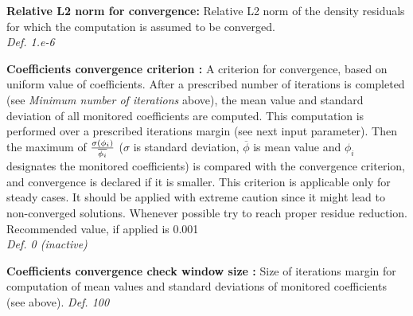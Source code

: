 \documentclass[12pt,epsf,colordvi]{article}
\begin{document}
\begin{description}
%
    \item{\bf Relative L2 norm for convergence:} Relative L2 norm of the density residuals for which the computation is assumed to be converged. \\
{\it Def. 1.e-6}
%
   \item{\bf Coefficients convergence criterion : } A criterion for convergence, based on uniform value of coefficients. After a prescribed number of iterations is completed (see {\it Minimum number of iterations } above), the mean value and standard deviation of all monitored coefficients are computed. This computation is performed over a prescribed iterations margin (see next input parameter). Then the maximum of \({{\sigma (\phi_i) } \over \overline{ \phi_i}} \)  (\(\sigma\) is standard deviation, \(\overline{\phi}\) is mean value and \(\phi_i\) designates the monitored coefficients)  is compared with the convergence criterion, and convergence is declared if it is smaller.
   This criterion is applicable only for steady cases. It should be applied with extreme caution since it might lead to non-converged
   solutions. Whenever possible try to reach proper residue reduction. Recommended value, if applied  is 0.001  \\
 {\it Def. 0 (inactive)}
%
   \item{\bf Coefficients convergence check window size :} Size of iterations margin for computation of mean values and standard deviations of  monitored coefficients (see above).
 {\it Def. 100}
%
%
\end{description}
%
%
\noindent 
\end{document}
